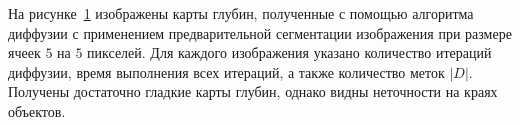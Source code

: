 \documentclass{ConfFTI}
\begin{document}
На рисунке~\ref{fig:result:superpixel} изображены карты глубин,
полученные с помощью алгоритма диффузии
с применением предварительной сегментации
изображения при размере ячеек $5$ на $5$ пикселей.
Для каждого изображения указано количество итераций диффузии,
время выполнения всех итераций, а также количество меток $\left| D \right|$.
Получены достаточно гладкие карты глубин,
однако видны неточности на краях объектов.

\begin{figure}[h!]
    \centering
     \qquad
     \qquad
    \label{fig:result:superpixel}
\end{figure}
\end{document}
